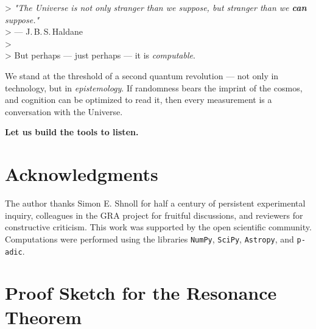 \documentclass[12pt,a4paper]{article}
\theoremstyle{plain}
\theoremstyle{definition}
\theoremstyle{remark}
\begin{document}
> \emph{"The Universe is not only stranger than we suppose, but stranger than we \textbf{can} suppose."} \\
> --- J.\,B.\,S.\,Haldane \\
> \\
> But perhaps --- just perhaps --- it is \emph{computable}.

We stand at the threshold of a second quantum revolution --- not only in technology, but in \emph{epistemology}. If randomness bears the imprint of the cosmos, and cognition can be optimized to read it, then every measurement is a conversation with the Universe.

\textbf{Let us build the tools to listen.}

\section*{Acknowledgments}
The author thanks Simon E. Shnoll for half a century of persistent experimental inquiry, colleagues in the GRA project for fruitful discussions, and reviewers for constructive criticism. This work was supported by the open scientific community. Computations were performed using the libraries \texttt{NumPy}, \texttt{SciPy}, \texttt{Astropy}, and \texttt{p-adic}.

\appendix
\section{Proof Sketch for the Resonance Theorem}
\label{app:proof}
\end{document}
